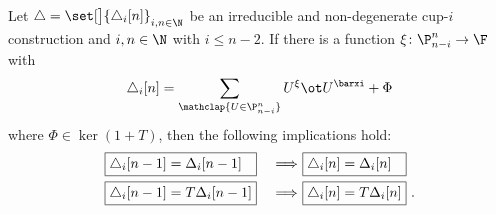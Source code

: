 
\begin{lemma}\label{l:first nail}
	Let $\triangle = \set[\big]{\triangle_i[n]}_{i,n\in\N}$ be an irreducible and non-degenerate \mbox{cup-$i$} construction and $i,n \in \N$ with $i \leq n-2$.
	If there is a function $\xi \colon \P_{n-i}^n \to \F$ with
	\begin{equation}\label{e:xi and barxi}
		\triangle_i [n] =
		\sum_{\mathclap{U \in \P_{n-i}^n}} U^{\xi} \ot U^{\barxi} + \Phi
	\end{equation}
	where $\Phi \in \ker(1+T)$,	 then the following implications hold:
	\begin{alignat*}{2}
		&\boxed{\triangle_i [n-1] = \Delta_i [n-1] \kern 7.3pt}\ &\Longrightarrow\
		&\boxed{\triangle_i [n] = \Delta_i [n] \kern 7.3pt} \\
		&\boxed{\triangle_i [n-1] = T \Delta_i [n-1]}\ &\Longrightarrow\
		&\boxed{\triangle_i [n] = T \Delta_i [n]} \ .
	\end{alignat*}
\end{lemma}


